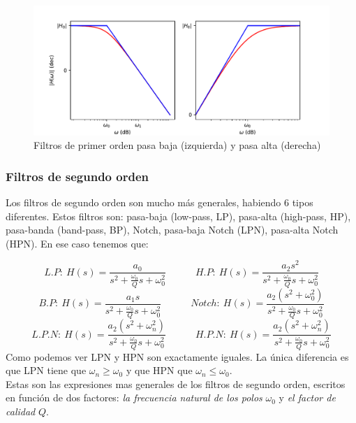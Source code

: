 \documentclass[12pt,a4paper]{article}
\numberwithin{equation}{section}
\numberwithin{figure}{section}
\newcommand{\tquad}{\quad \quad \quad}
\begin{document}
\begin{figure}[h!] \centering
\includegraphics[scale=0.9]{2.4-1orden.pdf}
\caption{Filtros de primer orden pasa baja (izquierda) y pasa alta (derecha)}
\label{Fig:2.08}
\end{figure}

\subsubsection{Filtros de segundo orden}

Los filtros de segundo orden son mucho más generales, habiendo 6 tipos diferentes. Estos filtros son: pasa-baja (low-pass, LP), pasa-alta (high-pass, HP), pasa-banda (band-pass, BP), Notch, pasa-baja Notch (LPN), pasa-alta Notch (HPN).  En ese caso tenemos que:

\begin{equation}
L.P:  \ H(s) = \dfrac{a_0}{s^2 + \frac{\omega_0}{Q}s + \omega_0^2} \tquad  
H.P:  \ H(s) = \dfrac{a_2 s^2}{s^2+ \frac{\omega_0}{Q} s + \omega_0^2}  
\end{equation}
\begin{equation}
B.P:  \ H(s) = \dfrac{a_1 s}{s^2+ \frac{\omega_0}{Q} s + \omega_0^2} \tquad
Notch:  \ H(s) = \dfrac{a_2 (s^2 + \omega_0^2)}{s^2+ \frac{\omega_0}{Q}s + \omega_0^2}   
\end{equation}
\begin{equation}
L.P.N:  \ H(s) = \dfrac{a_2 (s^2 + \omega_n^2)}{s^2+\frac{\omega_0}{Q}s+ \omega_0^2}  \tquad
H.P.N:  \ H(s) = \dfrac{a_2 (s^2 + \omega_n^2)}{s^2+\frac{\omega_0}{Q}s+ \omega_0^2} 
\end{equation}
Como podemos ver LPN y HPN son exactamente iguales. La única diferencia es que LPN tiene que $\omega_n \geq \omega_0$ y que HPN que $\omega_n \leq \omega_0$. \\

Estas son las expresiones mas generales de los filtros de segundo orden, escritos en función de dos factores: \textit{la frecuencia natural de los polos} $\omega_0$ y \textit{el factor de calidad} $Q$.
\end{document}
